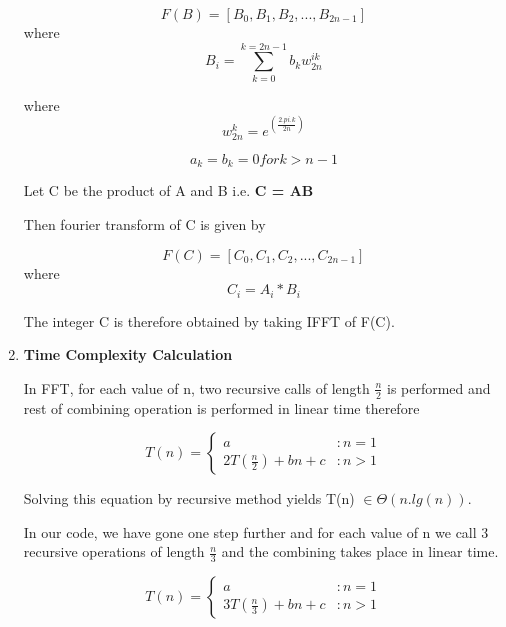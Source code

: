 \documentclass[a4paper,11pt]{article}
\begin{document}
\begin{enumerate}
\begin{equation}
F(B) = [B_{0}, B_{1}, B_{2}, ..., B_{2n-1}]\end{equation} where \begin{equation}
B_i = \sum_{k=0}^{k=2n-1} b_{k}w_{2n}^{ik}\end{equation}

where \begin{equation}
w_{2n}^k = e^(\frac{2.pi.k}{2n}) \end{equation}

\begin{equation}
a_{k} = b_{k} = 0 for k > n-1 \end{equation}

Let C be the product of A and B i.e. \textbf{C = AB}

Then fourier transform of C is given by

\begin{equation}
F(C) = [C_{0}, C_{1}, C_{2}, ..., C_{2n-1}] \end{equation} where \begin{equation}
C_i = A_i * B_i\end{equation}

The integer C is therefore obtained by taking IFFT of F(C).

\item \textbf{Time Complexity Calculation}

In FFT, for each value of n, two recursive calls of length $\frac{n}{2}$ is performed and rest of combining operation is performed in linear time therefore

 \begin{displaymath}   T(n) = \left\{
     \begin{array}{lr}
       a & : n = 1\\
       2T(\frac{n}{2}) + bn +c & : n > 1
     \end{array}
   \right.
\end{displaymath}

Solving this equation by recursive method yields T(n) $\in \Theta (n.lg(n))$.

In our code, we have gone one step further and for each value of n we call 3 recursive operations of length $\frac{n}{3}$ and the combining takes place in linear time.

 \begin{displaymath}   T(n) = \left\{
     \begin{array}{lr}
       a & : n = 1\\
       3T(\frac{n}{3}) + bn +c & : n > 1
     \end{array}
   \right.
\end{displaymath}
\end{enumerate}
\end{document}
